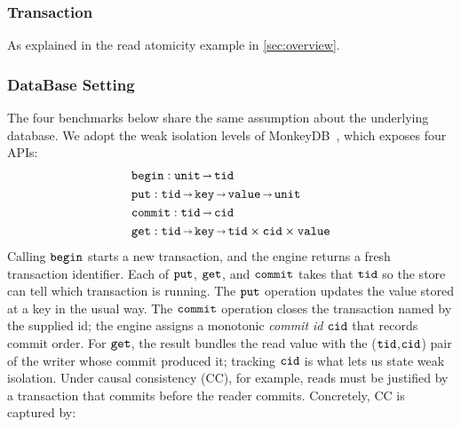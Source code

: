 \subsubsection*{Transaction} As explained in the read atomicity example in \autoref{sec:overview}.

\newpage

\subsubsection*{DataBase Setting}
The four benchmarks below share the same assumption about the underlying database. We adopt the weak isolation levels of MonkeyDB~\cite{MonkeyDB}, which exposes four APIs:
\begin{align*}
  &\boldsymbol{{\tt begin}} : {\tt unit} {\,\shortrightarrow\,} {\tt tid}
  \\&\boldsymbol{{\tt put}}: {\tt tid} {\,\shortrightarrow\,} {\tt key} {\,\shortrightarrow\,} {\tt value} {\,\shortrightarrow\,} {\tt unit}
  \\&\boldsymbol{{\tt commit}}: {\tt tid} {\,\shortrightarrow\,} {\tt cid}
  \\&\boldsymbol{{\tt get}}: {\tt tid} {\,\shortrightarrow\,} {\tt key} {\,\shortrightarrow\,} {\tt tid} \times {\tt cid} \times {\tt value} 
\end{align*}
\noindent
Calling $\boldsymbol{{\tt begin}}$ starts a new transaction, and the engine returns a fresh transaction identifier. Each of $\boldsymbol{{\tt put}}$, $\boldsymbol{{\tt get}}$, and $\boldsymbol{{\tt commit}}$ takes that ${\tt tid}$ so the store can tell which transaction is running. The $\boldsymbol{{\tt put}}$ operation updates the value stored at a key in the usual way. The $\boldsymbol{{\tt commit}}$ operation closes the transaction named by the supplied id; the engine assigns a monotonic \emph{commit id} ${\tt cid}$ that records commit order. For $\boldsymbol{{\tt get}}$, the result bundles the read value with the (${\tt tid}$,${\tt cid}$) pair of the writer whose commit produced it; tracking ${\tt cid}$ is what lets us state weak isolation. Under causal consistency (CC), for example, reads must be justified by a transaction that commits before the reader commits. Concretely, CC is captured by:
